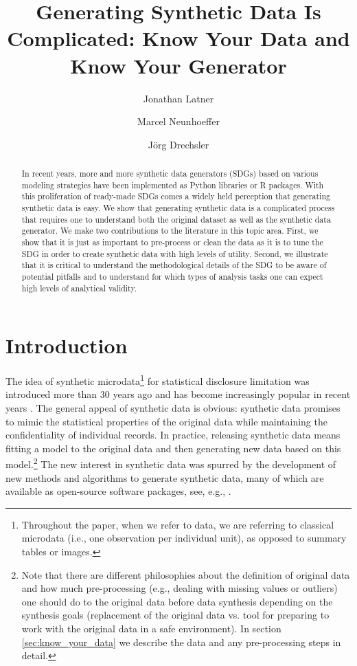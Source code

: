\documentclass[runningheads]{llncs}
\title{Generating Synthetic Data Is Complicated: Know Your Data and Know Your Generator}
\author{Jonathan Latner\inst{1}\orcidID{0000-0002-1825-0097} \and
Marcel Neunhoeffer\inst{1,2}\orcidID{0000-0002-9137-5785}  \and
J\"{o}rg Drechsler\inst{1,2,3}\orcidID{0009-0009-5790-3394}}
\institute{Institute for Employment Research, Nuremberg, Germany 
\email{\{jonathan.latner, marcel.neunhoeffer,joerg.drechsler\}@iab.de} \and
Ludwig-Maximilians-Universit\"at, Munich, Germany \and
University of Maryland, College Park, USA
}
\begin{document}
\maketitle 

\begin{abstract}

In recent years, more and more synthetic data generators (SDGs) based on various modeling strategies have been implemented as Python libraries or R packages. With this proliferation of ready-made SDGs comes a widely held perception that generating synthetic data is easy.  We show that generating synthetic data is a complicated process that requires one to understand both the original dataset as well as the synthetic data generator.  We make two contributions to the literature in this topic area.  First, we show that it is just as important to pre-process or clean the data as it is to tune the SDG in order to create synthetic data with high levels of utility. Second, we illustrate that it is critical to understand the methodological details of the SDG to be aware of potential pitfalls and to understand for which types of analysis tasks one can expect high levels of analytical validity.

\end{abstract}

\section{Introduction}

The idea of synthetic microdata\footnote{Throughout the paper, when we refer to data, we are referring to classical microdata (i.e., one observation per individual unit), as opposed to summary tables or images.} for statistical disclosure limitation was introduced more than 30 years ago \cite{rubin1993statistical,little1993statistical,liew1985data} and has become increasingly popular in recent years \cite{jordon2022synthetic,drechsler202330}. The general appeal of synthetic data is obvious: synthetic data promises to mimic the statistical properties of the original data while maintaining the confidentiality of individual records. In practice, releasing synthetic data means fitting a model to the original data and then generating new data based on this model.\footnote{Note that there are different philosophies about the definition of original data and how much pre-processing (e.g., dealing with missing values or outliers) one should do to the original data before data synthesis depending on the synthesis goals (replacement of the original data vs. tool for preparing to work with the original data in a safe environment). In section \ref{sec:know_your_data} we describe the data and any pre-processing steps in detail.} The new interest in synthetic data was spurred by the development of new methods and algorithms to generate synthetic data, many of which are available as open-source software packages, see, e.g., \cite{nowok2016synthpop,ping2017datasynthesizer,ctgan}. 
\end{document}
